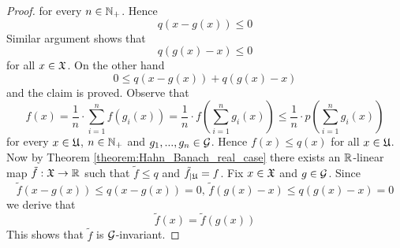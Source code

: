 \begin{proof}
for every $n\in {\mathbb N}_+$. Hence 
$$q\left(x - g(x)\right) \leq 0$$
Similar argument shows that
$$q\left(g(x) - x\right) \leq 0$$
for all $x \in {\mathfrak X}$. On the other hand
$$0 \leq q\left(x - g(x)\right) + q\left(g(x) - x\right)$$
and the claim is proved. Observe that
$$f(x) = \frac{1}{n}\cdot \sum_{i=1}^nf\left(g_i(x)\right) = \frac{1}{n}\cdot f\left(\sum_{i=1}^ng_i(x)\right) \leq \frac{1}{n}\cdot p\left(\sum_{i=1}^ng_i(x)\right)$$
for every $x \in {\mathfrak U}$, $n\in {\mathbb N}_+$ and $g_1,...,g_n\in {\mathcal G}$. Hence $f(x) \leq q(x)$ for all $x\in {\mathfrak U}$. Now by Theorem \ref{theorem:Hahn_Banach_real_case} there exists an ${\mathbb R}$-linear map $\tilde{f}:{\mathfrak X}\rightarrow {\mathbb R}$ such that $\tilde{f} \leq q$ and $\tilde{f}_{\mid {\mathfrak U}} = f$. Fix $x \in {\mathfrak X}$ and $g \in {\mathcal G}$. Since
$$\tilde{f}\left(x - g(x)\right) \leq q\left(x - g(x)\right) = 0,\,\tilde{f}\left(g(x) - x\right) \leq q\left(g(x) - x\right) = 0$$
we derive that
$$\tilde{f}(x) = \tilde{f}\left(g(x)\right)$$
This shows that $\tilde{f}$ is ${\mathcal G}$-invariant.
\end{proof}













\small




